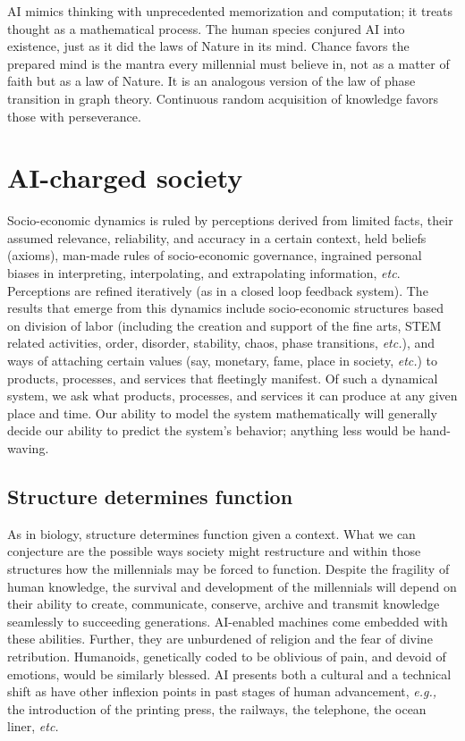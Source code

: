 \begin{multicols}{2}
AI mimics thinking with unprecedented memorization and computation; it treats thought as a mathematical process. The human species conjured AI into existence, just as it did the laws of Nature in its mind. Chance favors the prepared mind is the mantra every millennial must believe in, not as a matter of faith but as a law of Nature. It is an analogous version of the law of phase transition in graph theory. Continuous random acquisition of knowledge favors those with perseverance.\\[-24pt]

\section{AI-charged society}

\vskip -4pt

Socio-economic dynamics is ruled by perceptions derived from limited facts, their assumed relevance, reliability, and accuracy in a certain context, held beliefs (axioms), man-made rules of socio-economic governance, ingrained personal biases in interpreting, interpolating, and extrapolating information, \textit{etc}. Perceptions are refined iteratively (as in a closed loop feedback system). The results that emerge from this dynamics include socio-economic structures based on division of labor (including the creation and support of the fine arts, STEM related activities, order, disorder, stability, chaos, phase transitions, \textit{etc.}), and ways of attaching certain values (say, monetary, fame, place in society, \textit{etc.}) to products, processes, and services that fleetingly manifest. Of such a dynamical system, we ask what products, processes, and services it can produce at any given place and time. Our ability to model the system mathematically will generally decide our ability to predict the system's behavior; anything less would be hand-waving.\\[-15pt]

\subsection{Structure determines function}

\vskip -4pt

As in biology, structure determines function given a context. What we can conjecture are the possible ways society might restructure and within those structures how the millennials may be forced to function. Despite the fragility of human knowledge, the survival and development of the millennials will depend on their ability to create, communicate, conserve, archive and transmit knowledge seamlessly to succeeding generations. AI-enabled machines come embedded with these abilities. Further, they are unburdened of religion and the fear of divine retribution. Humanoids, genetically coded to be oblivious of pain, and devoid of emotions, would be similarly blessed. AI presents both a cultural and a technical shift as have other inflexion points in past stages of human advancement, \textit{e.g.,} the introduction of the printing press, the railways, the telephone, the ocean liner, \textit{etc.} 


\end{multicols}
